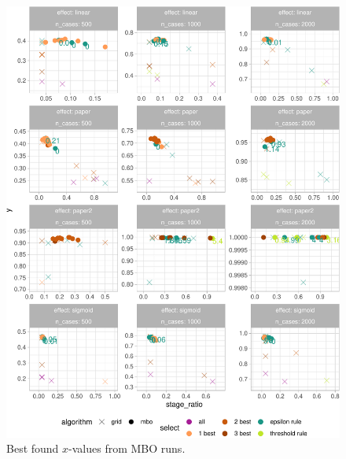 \documentclass[bimj,fleqn]{w-art}
\theoremstyle{plain}
\theoremstyle{definition}
\begin{document}
\begin{figure}[htb]
\begin{center}
\includegraphics[width=\linewidth]{generated/figures/plot_best_x.pdf}
\caption{Best found $x$-values from MBO runs.}
\end{center}
\end{figure}
\end{document}
